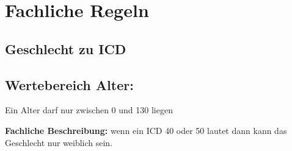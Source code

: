 
\chapter{Fachliche Regeln}
\section{Geschlecht zu ICD}\label{GeschlechtZuICD}
\section{Wertebereich Alter:}\label{Rule:WertebereichAlter}
Ein Alter darf nur zwischen 0 und 130 liegen

\textbf{Fachliche Beschreibung: }wenn ein ICD 40 oder 50 lautet dann kann das Geschlecht nur weiblich sein.\\

